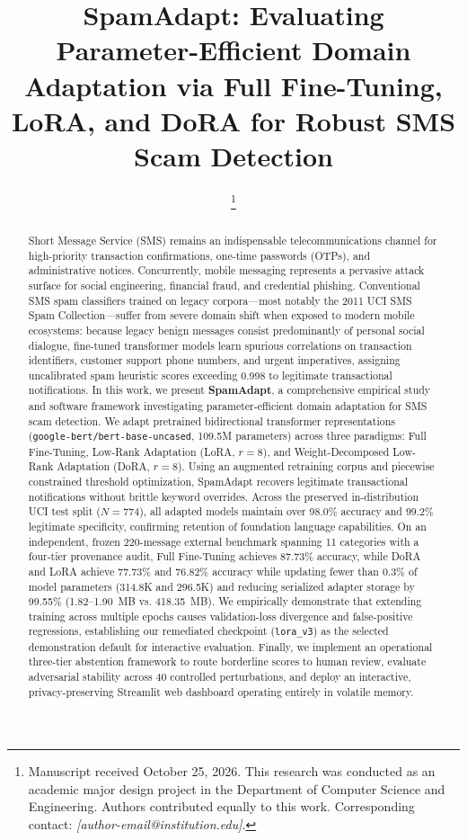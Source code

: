 \documentclass[conference]{IEEEtran}
\title{SpamAdapt: Evaluating Parameter-Efficient Domain Adaptation via Full Fine-Tuning, LoRA, and DoRA for Robust SMS Scam Detection}
\author{
    \IEEEauthorblockN{Akash Uchachariya\IEEEauthorrefmark{1}, Umang Mori\IEEEauthorrefmark{1}, and Keval Bamarotiya\IEEEauthorrefmark{1}}
    \IEEEauthorblockA{\IEEEauthorrefmark{1}\textit{Department of Computer Science and Engineering} \\
    \textit{[Institution / University Name]} \quad \textit{[City, State, Country]} \\
    \textit{Emails: [akash.uchachariya@institution.edu, umang.mori@institution.edu, keval.bamarotiya@institution.edu]}}
    \thanks{Manuscript received October 25, 2026. This research was conducted as an academic major design project in the Department of Computer Science and Engineering. Authors contributed equally to this work. Corresponding contact: \textit{[author-email@institution.edu]}.}
}
\begin{document}
\maketitle

\begin{abstract}
Short Message Service (SMS) remains an indispensable telecommunications channel for high-priority transaction confirmations, one-time passwords (OTPs), and administrative notices. Concurrently, mobile messaging represents a pervasive attack surface for social engineering, financial fraud, and credential phishing. Conventional SMS spam classifiers trained on legacy corpora---most notably the 2011 UCI SMS Spam Collection---suffer from severe domain shift when exposed to modern mobile ecosystems: because legacy benign messages consist predominantly of personal social dialogue, fine-tuned transformer models learn spurious correlations on transaction identifiers, customer support phone numbers, and urgent imperatives, assigning uncalibrated spam heuristic scores exceeding 0.998 to legitimate transactional notifications. In this work, we present \textbf{SpamAdapt}, a comprehensive empirical study and software framework investigating parameter-efficient domain adaptation for SMS scam detection. We adapt pretrained bidirectional transformer representations (\texttt{google-bert/bert-base-uncased}, 109.5M parameters) across three paradigms: Full Fine-Tuning, Low-Rank Adaptation (LoRA, $r=8$), and Weight-Decomposed Low-Rank Adaptation (DoRA, $r=8$). Using an augmented retraining corpus and piecewise constrained threshold optimization, SpamAdapt recovers legitimate transactional notifications without brittle keyword overrides. Across the preserved in-distribution UCI test split ($N=774$), all adapted models maintain over 98.0\% accuracy and 99.2\% legitimate specificity, confirming retention of foundation language capabilities. On an independent, frozen 220-message external benchmark spanning 11 categories with a four-tier provenance audit, Full Fine-Tuning achieves 87.73\% accuracy, while DoRA and LoRA achieve 77.73\% and 76.82\% accuracy while updating fewer than 0.3\% of model parameters (314.8K and 296.5K) and reducing serialized adapter storage by 99.55\% (1.82--1.90~MB vs. 418.35~MB). We empirically demonstrate that extending training across multiple epochs causes validation-loss divergence and false-positive regressions, establishing our remediated checkpoint (\texttt{lora\_v3}) as the selected demonstration default for interactive evaluation. Finally, we implement an operational three-tier abstention framework to route borderline scores to human review, evaluate adversarial stability across 40 controlled perturbations, and deploy an interactive, privacy-preserving Streamlit web dashboard operating entirely in volatile memory.
\end{abstract}
\end{document}
